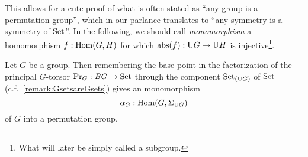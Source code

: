 This allows for a cute proof of what is often stated as ``any group is a permutation group'', which in our parlance translates to ``any symmetry is a symmetry of $\mathrm{Set}$''.
In the following, we should call {\em monomorphism} a homomorphism
$f:\Hom(G,H)$ for which $\mathrm{abs}(f):\mathrm{U} G\to\mathrm{U} H$ is
injective\footnote{What will later be simply called a subgroup.}.
\begin{lemma}
  \label{lem:allgpsarepermutationgps}Let $G$ be a group. Then
  remembering the base point in the factorization of the principal
  $G$-torsor $\mathrm{Pr}_{{G}}:\mathit{B}\mathit{G}\to\mathrm{Set}$ through the component
  ${{\mathrm{Set}}_{\left(\mathrm{U} G\right)}}$ of $\mathrm{Set}$ (c.f.~\cref{remark:GsetsareGsets})
  gives an monomorphism
  $$\alpha_G:\Hom(G,\Sigma_{\USym G})$$  
  of $G$ into a permutation group.
\end{lemma}
